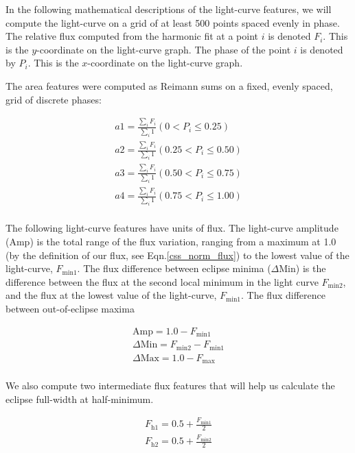 \documentclass[12pt]{article} %
\numberwithin{equation}{section} %
\begin{document}
In the following mathematical descriptions of the light-curve features, we will compute the light-curve on a grid of at least 500 points spaced evenly in phase. The relative flux computed from the harmonic fit at a point $i$  is denoted $F_{i}$. This is the $y$-coordinate on the light-curve graph. The phase of the point $i$ is denoted by $P_{i}$. This is the $x$-coordinate on the light-curve graph.

The area features were computed as Reimann sums on a fixed, evenly spaced, grid of discrete phases:

\begin{multline} \label{area_features}
a1  = \frac{\sum_{i}F_{i}}{\sum_{i} 1} (0 < P_{i} \leq 0.25) \\
a2  = \frac{\sum_{i}F_{i}}{\sum_{i} 1}  (0.25 < P_{i} \leq 0.50) \\
a3  = \frac{\sum_{i}F_{i}}{\sum_{i} 1}  (0.50 < P_{i} \leq 0.75) \\
a4  = \frac{\sum_{i}F_{i}}{\sum_{i} 1}  (0.75 < P_{i} \leq 1.00) \\
\end{multline}

The following light-curve features have units of flux. The light-curve amplitude (Amp) is the total range of the flux variation, ranging from a maximum at 1.0 (by the definition of our flux, see Eqn.\ref{css_norm_flux}) to the lowest value of the light-curve, $F_{\text{min1}}$. The flux difference between eclipse minima ($\Delta$Min) is the difference between the flux at the second local minimum in the light curve $F_{\text{min2}}$, and the flux at the lowest value of the light-curve, $F_{\text{min1}}$. The flux difference between out-of-eclipse maxima 

\begin{multline} \label{flux_features}
\text{Amp} = 1.0 -  F_{\text{min1}} \\
\Delta \text{Min} =  F_{\text{min2}} - F_{\text{min1}} \\
\Delta \text{Max} = 1.0 - F_{\text{max}} \\
\end{multline}

We also compute two intermediate flux features that will help us calculate the eclipse full-width at half-minimum. 

\begin{multline}
F_{\text{h1}} = 0.5 + \frac{F_{\text{min1}}}{2} \\
F_{\text{h2}} = 0.5 + \frac{F_{\text{min2}}}{2} \\
\end{multline}
\end{document}
